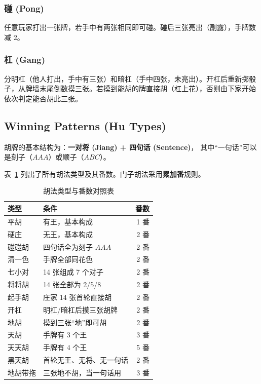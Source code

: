 \documentclass[11pt,a4paper]{article}
\begin{document}
\subsubsection*{碰 (Pong)}
任意玩家打出一张牌，若手中有两张相同即可碰。碰后三张亮出（副露），手牌数减 2。

\subsubsection*{杠 (Gang)}
分明杠（他人打出，手中有三张）和暗杠（手中四张，未亮出）。开杠后重新掷骰子，从牌墙末尾倒数摸三张。若摸到能胡的牌直接胡（杠上花），否则由下家开始依次判定能否胡此三张。

\subsection{Winning Patterns (Hu Types)}

胡牌的基本结构为：\textbf{一对将 (Jiang) + 四句话 (Sentence)}，
其中``一句话''可以是刻子（$AAA$）或顺子（$ABC$）。

表~\ref{tab:hu_types} 列出了所有胡法类型及其番数。门子胡法采用\textbf{累加番}规则。

\begin{table}[H]
\centering
\caption{胡法类型与番数对照表}
\label{tab:hu_types}
\small
\begin{tabular}{@{}llr@{}}
\toprule
\textbf{类型} & \textbf{条件} & \textbf{番数} \\
\midrule
平胡       & 有王，基本构成                & 1 番 \\
硬庄       & 无王，基本构成                & 2 番 \\
碰碰胡     & 四句话全为刻子 $AAA$          & 2 番 \\
清一色     & 手牌全部同花色               & 2 番 \\
七小对     & 14 张组成 7 个对子            & 2 番 \\
将将胡     & 14 张全部为 2/5/8             & 2 番 \\
起手胡     & 庄家 14 张首轮直接胡          & 2 番 \\
开杠       & 明杠/暗杠后摸三张胡牌         & 2 番 \\
地胡       & 摸到三张``地''即可胡          & 2 番 \\
天胡       & 手牌有 3 个王               & 3 番 \\
天天胡     & 手牌有 4 个王               & 5 番 \\
黑天胡     & 首轮无王、无将、无一句话      & 2 番 \\
地胡带拖   & 三张地不胡，当一句话用        & 3 番 \\
\bottomrule
\end{tabular}
\end{table}
\end{document}
